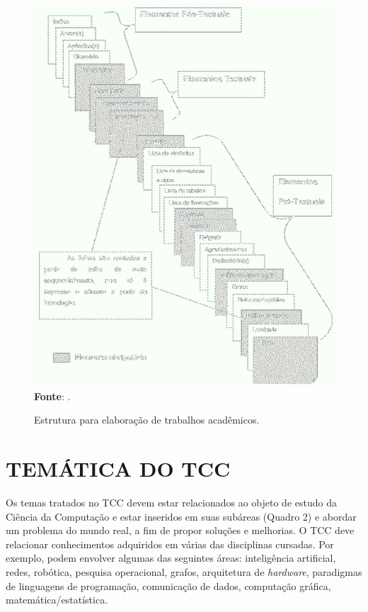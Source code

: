\begin{figure}[htb]
	\centering
	\caption{Estrutura para elaboração de trabalhos acadêmicos.}
	\includegraphics[scale=0.6]{imagens/Estrutura-Trabalhos.png} 
	\newline \textbf{Fonte}: \cite{webLink}.
	\label{fig:EstruturaTrab}
\end{figure}

\section{TEMÁTICA DO TCC}\label{sec:TEMÁTICATCC}
Os temas tratados no TCC devem estar relacionados ao objeto de estudo da Ciência da Computação e estar inseridos em suas subáreas (Quadro 2) e abordar um problema do mundo real, a fim de propor soluções e melhorias. O TCC deve relacionar conhecimentos adquiridos em várias das disciplinas cursadas. Por exemplo, podem envolver algumas das seguintes áreas: inteligência artificial, redes, robótica, pesquisa operacional, grafos, arquitetura de \textit{hardware}, paradigmas de linguagens de programação, comunicação de dados, computação gráfica, matemática/estatística.  


